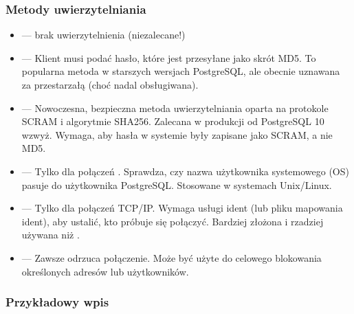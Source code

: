 \documentclass[a4paper,11pt,openany,english]{sphinxmanual}
\begin{document}
\subsubsection{Metody uwierzytelniania}
\label{\detokenize{rozdzial2/Bezpieczenstwo/index:metody-uwierzytelniania}}\begin{itemize}
\item {} 
\sphinxAtStartPar
{} — brak uwierzytelnienia (niezalecane!)

\item {} 
\sphinxAtStartPar
{} — Klient musi podać hasło, które jest przesyłane jako skrót MD5.
To popularna metoda w starszych wersjach PostgreSQL, ale obecnie uznawana za przestarzałą (choć nadal obsługiwana).

\item {} 
\sphinxAtStartPar
{} — Nowoczesna, bezpieczna metoda uwierzytelniania oparta na protokole SCRAM i algorytmie SHA\sphinxhyphen{}256.
Zalecana w produkcji od PostgreSQL 10 wzwyż. Wymaga, aby hasła w systemie były zapisane jako SCRAM, a nie MD5.

\item {} 
\sphinxAtStartPar
{} — Tylko dla połączeń . Sprawdza, czy nazwa użytkownika systemowego (OS) pasuje do użytkownika PostgreSQL.
Stosowane w systemach Unix/Linux.

\item {} 
\sphinxAtStartPar
{} — Tylko dla połączeń TCP/IP. Wymaga usługi ident (lub pliku mapowania ident), aby ustalić, kto próbuje się połączyć.
Bardziej złożona i rzadziej używana niż .

\item {} 
\sphinxAtStartPar
{} — Zawsze odrzuca połączenie. Może być użyte do celowego blokowania określonych adresów lub użytkowników.

\end{itemize}


\subsubsection{Przykładowy wpis}
\label{\detokenize{rozdzial2/Bezpieczenstwo/index:przykladowy-wpis}}
\begin{sphinxVerbatim}[commandchars=\\\{\}]
                                                
\end{sphinxVerbatim}
\end{document}
